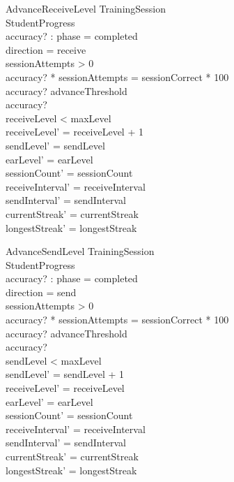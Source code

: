 \documentclass[a4paper,10pt,fleqn]{article}
\begin{document}
\begin{schema}{AdvanceReceiveLevel}
\Xi TrainingSession \\
\Delta StudentProgress \\
accuracy? : \nat
\where
phase = completed \\
direction = receive \\
sessionAttempts > 0 \\
accuracy? * sessionAttempts = sessionCorrect * 100 \\
accuracy? \geq advanceThreshold \\
accuracy?  \\
receiveLevel < maxLevel \\
receiveLevel' = receiveLevel + 1 \\
sendLevel' = sendLevel \\
earLevel' = earLevel \\
sessionCount' = sessionCount \\
receiveInterval' = receiveInterval \\
sendInterval' = sendInterval \\
currentStreak' = currentStreak \\
longestStreak' = longestStreak
\end{schema}

\begin{schema}{AdvanceSendLevel}
\Xi TrainingSession \\
\Delta StudentProgress \\
accuracy? : \nat
\where
phase = completed \\
direction = send \\
sessionAttempts > 0 \\
accuracy? * sessionAttempts = sessionCorrect * 100 \\
accuracy? \geq advanceThreshold \\
accuracy?  \\
sendLevel < maxLevel \\
sendLevel' = sendLevel + 1 \\
receiveLevel' = receiveLevel \\
earLevel' = earLevel \\
sessionCount' = sessionCount \\
receiveInterval' = receiveInterval \\
sendInterval' = sendInterval \\
currentStreak' = currentStreak \\
longestStreak' = longestStreak
\end{schema}
\end{document}
